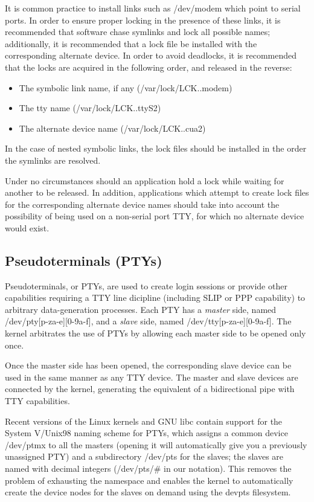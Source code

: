 It is common practice to install links such as {\file /dev/modem\/}
which point to serial ports.  In order to ensure proper locking in the
presence of these links, it is recommended that software chase
symlinks and lock all possible names; additionally, it is recommended
that a lock file be installed with the corresponding alternate
device.  In order to avoid deadlocks, it is recommended that the locks
are acquired in the following order, and released in the reverse:
\begin{itemize}
\item{The symbolic link name, if any ({\file /var/lock/LCK..modem})}
\item{The {\file tty} name ({\file /var/lock/LCK..ttyS2})}
\item{The alternate device name ({\file /var/lock/LCK..cua2})}
\end{itemize}
In the case of nested symbolic links, the lock files should be
installed in the order the symlinks are resolved.

Under no circumstances should an application hold a lock while waiting
for another to be released.  In addition, applications which attempt
to create lock files for the corresponding alternate device names
should take into account the possibility of being used on a non-serial
port TTY, for which no alternate device would exist.

\subsection{Pseudoterminals (PTYs)}

Pseudoterminals, or PTYs, are used to create login sessions or provide
other capabilities requiring a TTY line dicipline (including SLIP or
PPP capability) to arbitrary data-generation processes.  Each PTY has
a {\em master\/} side, named {\file /dev/pty[p-za-e][0-9a-f]\/}, and a
{\em slave\/} side, named {\file /dev/tty[p-za-e][0-9a-f]\/}.  The
kernel arbitrates the use of PTYs by allowing each master side to be
opened only once.

Once the master side has been opened, the corresponding slave device
can be used in the same manner as any TTY device.  The master and
slave devices are connected by the kernel, generating the equivalent
of a bidirectional pipe with TTY capabilities.

Recent versions of the Linux kernels and GNU libc contain support for
the System V/Unix98 naming scheme for PTYs, which assigns a common
device {\file /dev/ptmx\/} to all the masters (opening it will
automatically give you a previously unassigned PTY) and a subdirectory
{\file /dev/pts\/} for the slaves; the slaves are named with decimal
integers ({\file /dev/pts/$\#$\/} in our notation).  This removes the
problem of exhausting the namespace and enables the kernel to
automatically create the device nodes for the slaves on demand using
the {\file devpts\/} filesystem.



